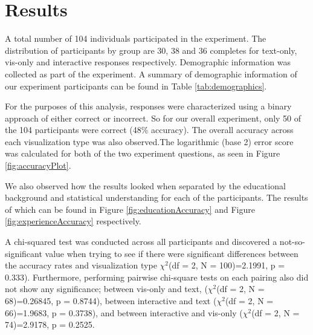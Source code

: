 \section{Results}

\demographicstable

\accuracyPlot

\educationAccuracy

\experienceAccuracy

\guessAError

A total number of 104 individuals participated in the experiment. The
distribution of participants by group are 30, 38 and 36 completes for
text-only, vis-only and interactive responses respectively. Demographic
information was collected as part of the experiment. A summary of demographic
information of our experiment participants can be found in Table \ref{tab:demographics}.

For the purposes of this analysis, responses were characterized using a
binary approach of either correct or incorrect. So for our overall
experiment, only 50 of the 104 participants were correct (48\% accuracy). The
overall accuracy across each visualization type was also observed.The
logarithmic (base 2) error score was calculated for both of the two
experiment questions, as seen in Figure \ref{fig:accuracyPlot}.

We also observed how the results looked when separated by the educational
background and statistical understanding for each of the participants. The
results of which can be found in Figure \ref{fig:educationAccuracy} and Figure \ref{fig:experienceAccuracy} respectively.

A chi-squared test was conducted across all participants and discovered a
not-so-significant value when trying to see if there were significant
differences between the accuracy rates and visualization type $\chi^2$(df = 2, N = 100)=2.1991, p = 0.333). Furthermore,
performing pairwise chi-square tests on each pairing also did not show any
significance; between vis-only and text, ($\chi^2$(df = 2, N = 68)=0.26845, p =
0.8744), between interactive and text ($\chi^2$(df = 2, N = 66)=1.9683, p =
0.3738), and between interactive and vis-only ($\chi^2$(df = 2, N = 74)=2.9178,
p = 0.2525.



